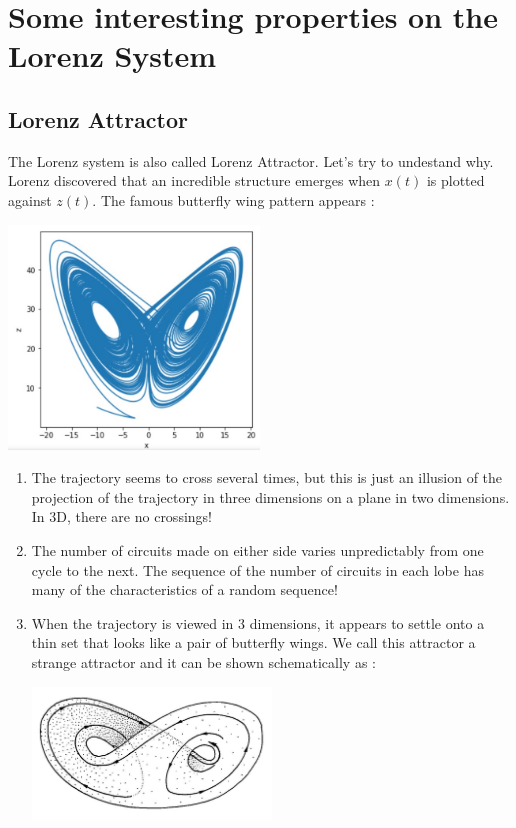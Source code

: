 \documentclass[12pt]{article}
\begin{document}
	\section{Some interesting properties on the Lorenz System}
	
	\subsection{Lorenz Attractor}
		
	The Lorenz system is also called Lorenz Attractor. Let's try to undestand why. Lorenz discovered that an incredible structure emerges when $x(t)$ is plotted against $z(t)$. The famous butterfly wing pattern appears :
	\begin{center}
		\includegraphics[width=0.5\textwidth]{"images/butterfly.jpg"}
	\end{center}
	\begin{enumerate}[label=\textbullet]
		\item The trajectory seems to cross several times, but this is just an illusion of the projection of the trajectory in three dimensions on a plane in two dimensions. In 3D, there are no crossings!
		\item The number of circuits made on either side varies unpredictably from one cycle to the next. The sequence of the number of circuits in each lobe has many of the characteristics of a random sequence!
		\item When the trajectory is viewed in 3 dimensions, it appears to settle onto a thin set that looks like a pair of butterfly wings. We call this attractor a strange attractor and it can be shown schematically as :
		\begin{center}
			\includegraphics[width=0.5\textwidth]{"images/butterfly3D.jpg"}
		\end{center}
	\end{enumerate}
	
\end{document}
